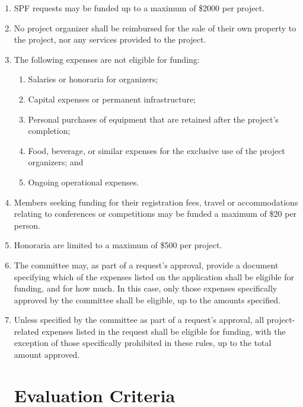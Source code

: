 \documentclass[oneside]{book}
\begin{document}
\begin{enumerate}
\item SPF requests may be funded up to a maximum of \$2000 per project. 
\item No project organizer shall be reimbursed for the sale of their own property to the project, nor any services provided to the project. 
\item The following expenses are not eligible for funding:
	\begin{enumerate}
	\item Salaries or honoraria for organizers;
	\item Capital expenses or permanent infrastructure;
	\item Personal purchases of equipment that are retained after the project’s completion;
	\item Food, beverage, or similar expenses for the exclusive use of the project organizers; and
	\item Ongoing operational expenses.
	\end{enumerate}
\item Members seeking funding for their registration fees, travel or accommodations relating to conferences or competitions may be funded a maximum of \$20 per person.
\item Honoraria are limited to a maximum of \$500 per project.
\item The committee may, as part of a request’s approval, provide a document specifying which of the expenses listed on the application shall be eligible for funding, and for how much. In this case, only those expenses specifically approved by the committee shall be eligible, up to the amounts specified. 
\item Unless specified by the committee as part of a request’s approval, all project-related expenses listed in the request shall be eligible for funding, with the exception of those specifically prohibited in these rules, up to the total amount approved. 

\chapter{\label{Evaluation_Criteria}Evaluation Criteria}


\end{enumerate}
\end{document}
